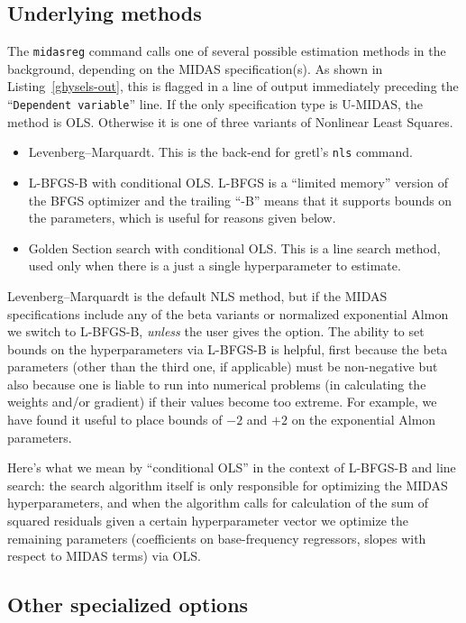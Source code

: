 \documentclass{article}
\begin{document}
\subsection{Underlying methods}

The \texttt{midasreg} command calls one of several possible estimation
methods in the background, depending on the MIDAS specification(s). As
shown in Listing~\ref{ghysels-out}, this is flagged in a line of
output immediately preceding the ``\texttt{Dependent variable}'' line.
If the only specification type is U-MIDAS, the method is
OLS. Otherwise it is one of three variants of Nonlinear Least Squares.
\begin{itemize}
\item Levenberg--Marquardt. This is the back-end for gretl's
  \texttt{nls} command.
\item L-BFGS-B with conditional OLS. L-BFGS is a ``limited memory''
  version of the BFGS optimizer and the trailing ``-B'' means that it
  supports bounds on the parameters, which is useful for reasons given
  below.
\item Golden Section search with conditional OLS. This is a line
  search method, used only when there is a just a single
  hyperparameter to estimate.
\end{itemize}

Levenberg--Marquardt is the default NLS method, but if the MIDAS
specifications include any of the beta variants or normalized
exponential Almon we switch to L-BFGS-B, \textit{unless} the user
gives the  option. The ability to set bounds on the
hyperparameters via L-BFGS-B is helpful, first because the beta
parameters (other than the third one, if applicable) must be
non-negative but also because one is liable to run into numerical
problems (in calculating the weights and/or gradient) if their values
become too extreme. For example, we have found it useful to place
bounds of $-2$ and $+2$ on the exponential Almon parameters.

Here's what we mean by ``conditional OLS'' in the context of L-BFGS-B
and line search: the search algorithm itself is only responsible for
optimizing the MIDAS hyperparameters, and when the algorithm calls for
calculation of the sum of squared residuals given a certain
hyperparameter vector we optimize the remaining parameters
(coefficients on base-frequency regressors, slopes with respect to
MIDAS terms) via OLS.


\subsection{Other specialized options}
\end{document}
